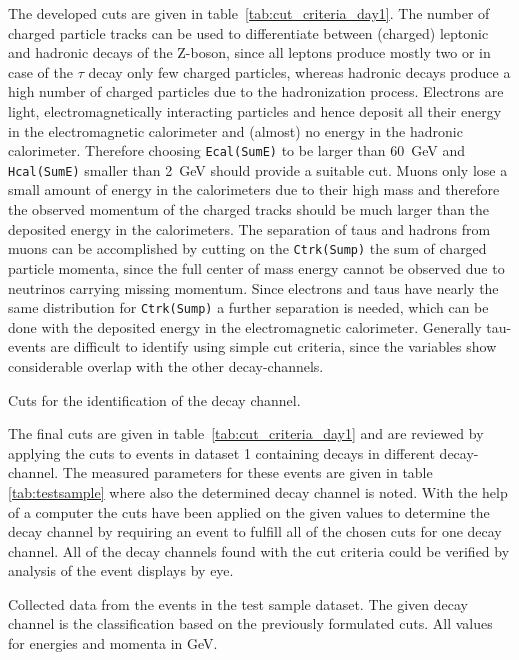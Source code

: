 \documentclass[11pt, a4paper]{article}
\numberwithin{equation}{section}
\begin{document}
The developed cuts are given in table~\ref{tab:cut_criteria_day1}.
The number of charged particle tracks can be used to differentiate between (charged) leptonic and hadronic decays of the Z-boson, since all leptons produce mostly two or in case of the $\tau$ decay only few charged particles, whereas hadronic decays produce a high number of charged particles due to the hadronization process.
Electrons are light, electromagnetically interacting particles and hence deposit all their energy in the electromagnetic calorimeter and (almost) no energy in the hadronic calorimeter.
Therefore choosing \texttt{Ecal(SumE)} to be larger than \SI{60}{GeV} and \texttt{Hcal(SumE)} smaller than \SI{2}{GeV} should provide a suitable cut.
Muons only lose a small amount of energy in the calorimeters due to their high mass and therefore the observed momentum of the charged tracks should be much larger than the deposited energy in the calorimeters.
The separation of taus and hadrons from muons can be accomplished by cutting on the \texttt{Ctrk(Sump)} the sum of charged particle momenta, since the full center of mass energy cannot be observed due to neutrinos carrying missing momentum.
Since electrons and taus have nearly the same distribution for \texttt{Ctrk(Sump)} a further separation is needed, which can be done with the deposited energy in the electromagnetic calorimeter.
Generally tau-events are difficult to identify using simple cut criteria, since the variables show considerable overlap with the other decay-channels.
\begin{table}[htb]
	\centering
	
	\caption{Cuts for the identification of the decay channel.}
	\label{tab:cut_criteria_day1}
\end{table}

The final cuts are given in table~\ref{tab:cut_criteria_day1} and are reviewed by applying the cuts to events in dataset 1 containing decays in different decay-channel.
The measured parameters for these events are given in table \ref{tab:testsample} where also the determined decay channel is noted.
With the help of a computer the cuts have been applied on the given values to determine the decay channel by requiring an event to fulfill all of the chosen cuts for one decay channel.
All of the decay channels found with the cut criteria could be verified by analysis of the event displays by eye.
\begin{table}
	\centering
		
	\caption{Collected data from the events in the test sample dataset. The given decay channel is the classification based on the previously formulated cuts. All values for energies and momenta in \si{GeV}.}
	\label{tab:testsample}
\end{table}
\end{document}
